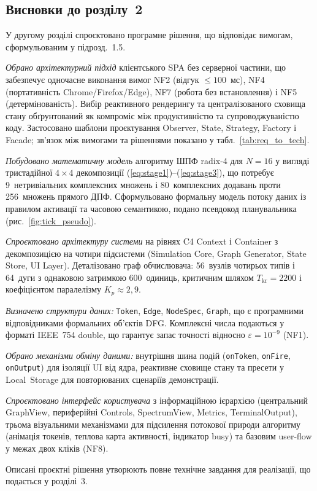 \subsection*{Висновки до розділу~2}

У другому розділі спроєктовано програмне рішення, що відповідає
вимогам, сформульованим у підрозд.~1.5.

\emph{Обрано архітектурний підхід} клієнтського SPA без серверної
частини, що забезпечує одночасне виконання вимог NF2 (відгук
$\le 100$~мс), NF4 (портативність Chrome/Firefox/Edge), NF7 (робота
без встановлення) і NF5 (детермінованість). Вибір реактивного
рендерингу та централізованого сховища стану обґрунтований як
компроміс між продуктивністю та супроводжуваністю коду. Застосовано
шаблони проєктування Observer, State, Strategy, Factory і Facade;
зв'язок між вимогами та рішеннями показано у
табл.~\ref{tab:req_to_tech}.

\emph{Побудовано математичну модель} алгоритму ШПФ radix-4 для
$N = 16$ у вигляді тристадійної $4 \times 4$ декомпозиції
(\ref{eq:stage1})--(\ref{eq:stage3}), що потребує 9~нетривіальних
комплексних множень і 80~комплексних додавань проти 256~множень
прямого ДПФ. Сформульовано формальну модель потоку даних із
правилом активації та часовою семантикою, подано псевдокод
планувальника (рис.~\ref{fig:tick_pseudo}).

\emph{Спроєктовано архітектуру системи} на рівнях C4 Context і
Container з декомпозицією на чотири підсистеми (Simulation Core,
Graph Generator, State Store, UI Layer). Деталізовано граф
обчислювача: 56~вузлів чотирьох типів і 64~дуги з однаковою
затримкою 600~одиниць, критичним шляхом $T_{\mathrm{kr}} = 2200$
і коефіцієнтом паралелізму $K_p \approx 2{,}9$.

\emph{Визначено структури даних:} \texttt{Token}, \texttt{Edge},
\texttt{NodeSpec}, \texttt{Graph}, що є програмними відповідниками
формальних об'єктів DFG. Комплексні числа подаються у форматі
IEEE~754 double, що гарантує запас точності відносно
$\varepsilon = 10^{-9}$ (NF1).

\emph{Обрано механізми обміну даними:} внутрішня шина подій
(\texttt{onToken}, \texttt{onFire}, \texttt{onOutput}) для ізоляції
UI від ядра, реактивне сховище стану та пресети у Local~Storage
для повторюваних сценаріїв демонстрації.

\emph{Спроєктовано інтерфейс користувача} з інформаційною ієрархією
(центральний GraphView, периферійні Controls, SpectrumView, Metrics,
TerminalOutput), трьома візуальними механізмами для підсилення
потокової природи алгоритму (анімація токенів, теплова карта
активності, індикатор busy) та базовим user-flow у межах двох
кліків (NF8).

Описані проєктні рішення утворюють повне технічне завдання для
реалізації, що подається у розділі~3.